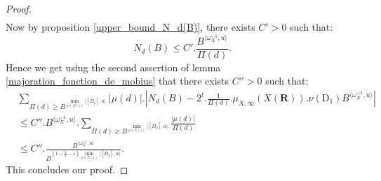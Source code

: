 \documentclass[10pt,a4paper]{amsart}
\newcommand{\R}{\mathbf{R}}
\newcommand{\w}{\omega}
\begin{document}
\begin{proof}
\begin{align*}
    \end{align*}
    Now by proposition \ref{upper_bound_N_d(B)}, there exists $C' > 0$ such that:
    $$N_d(B) \leqslant C'.\frac{B^{\langle \w_{X}^{-1} , u \rangle}}{\Pi(d)} .$$ Hence we get using the second assertion of lemma \ref{majoration_fonction_de_mobius} that there exists $C'' > 0$ such that:
    \begin{align*}
        &\sum\limits_{\Pi(d) \geqslant B^{\min\limits_{\rho \in \Sigma(1)} \langle [D_{\rho}] , u \rangle }} | \mu(d) | . \left| N_d(B) - 2^t . \frac{1}{\Pi(d)} . \mu_{X,\infty}(X(\R)). \nu(\mathrm{D}_1) B^{ \langle \w_{X}^{-1} , u \rangle } \right| \\
        &\leqslant C''. B^{\langle \w_X^{-1},u\rangle} .\sum\limits_{\Pi(d) \geqslant B^{\min\limits_{\rho \in \Sigma(1)} \langle [D_{\rho}] , u \rangle }} \frac{| \mu(d) |}{\Pi(d)} \\
        &\leqslant C''.\frac{B^{\langle \w_X^{-1},u\rangle}}{B^{(1-\frac{1}{l} - \varepsilon) \min\limits_{\rho \in \Sigma(1)} \langle [D_{\rho}],u\rangle } } .
    \end{align*}This concludes our proof.    
\end{proof}
\end{document}
